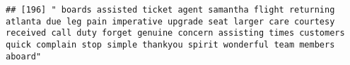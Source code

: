 \documentclass[
]{article}
\begin{document}
\begin{verbatim}
## [196] " boards assisted ticket agent samantha flight returning atlanta due leg pain imperative upgrade seat larger care courtesy received call duty forget genuine concern assisting times customers quick complain stop simple thankyou spirit wonderful team members aboard"                                                                                                                                                                                                                                                                                                                                                                                                                                                                                                                                                                                                                                                                                                                                                                                                                                                                                                                                                                                                                                                                                                                                                                                                                                                                                                                                                                                                                                                                                                                        

\end{verbatim}
\end{document}
